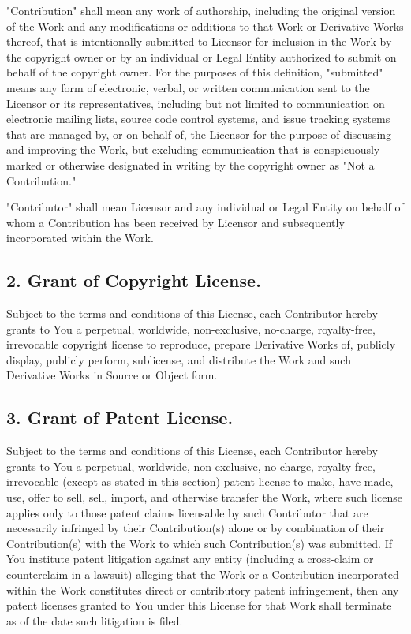 "Contribution" shall mean any work of authorship, including the original version of the Work and any modifications or additions to that Work or Derivative Works thereof, that is intentionally submitted to Licensor for inclusion in the Work by the copyright owner or by an individual or Legal Entity authorized to submit on behalf of the copyright owner. For the purposes of this definition, "submitted" means any form of electronic, verbal, or written communication sent to the Licensor or its representatives, including but not limited to communication on electronic mailing lists, source code control systems, and issue tracking systems that are managed by, or on behalf of, the Licensor for the purpose of discussing and improving the Work, but excluding communication that is conspicuously marked or otherwise designated in writing by the copyright owner as "Not a Contribution."

"Contributor" shall mean Licensor and any individual or Legal Entity on behalf of whom a Contribution has been received by Licensor and subsequently incorporated within the Work.

\subsection{2. Grant of Copyright License.}
Subject to the terms and conditions of this License, each Contributor hereby grants to You a perpetual, worldwide, non-exclusive, no-charge, royalty-free, irrevocable copyright license to reproduce, prepare Derivative Works of, publicly display, publicly perform, sublicense, and distribute the Work and such Derivative Works in Source or Object form.

\subsection{3. Grant of Patent License.}
Subject to the terms and conditions of this License, each Contributor hereby grants to You a perpetual, worldwide, non-exclusive, no-charge, royalty-free, irrevocable (except as stated in this section) patent license to make, have made, use, offer to sell, sell, import, and otherwise transfer the Work, where such license applies only to those patent claims licensable by such Contributor that are necessarily infringed by their Contribution(s) alone or by combination of their Contribution(s) with the Work to which such Contribution(s) was submitted. If You institute patent litigation against any entity (including a cross-claim or counterclaim in a lawsuit) alleging that the Work or a Contribution incorporated within the Work constitutes direct or contributory patent infringement, then any patent licenses granted to You under this License for that Work shall terminate as of the date such litigation is filed.

